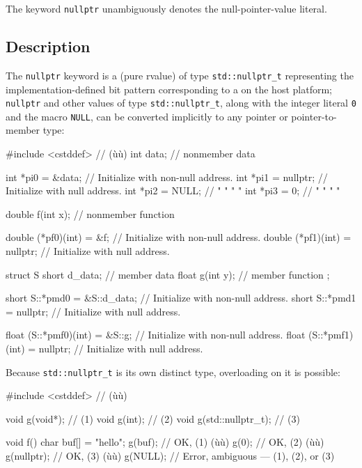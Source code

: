 
The keyword \lstinline!nullptr! unambiguously denotes the
null-pointer-value literal.

\subsection[Description]{Description}\label{description}

The \lstinline!nullptr! keyword is a  (pure rvalue) of type
\lstinline!std::nullptr_t! representing the implementation-defined
bit pattern corresponding to a  on the host platform;
\lstinline!nullptr! and other values of type \lstinline!std::nullptr_t!, along with the integer literal \lstinline!0! and the macro \lstinline!NULL!, can be converted implicitly to any pointer or pointer-to-member type:

\begin{emcppslisting}
#include <cstddef> // (ù{}ù)
int data;  // nonmember data

int *pi0 = &data;    // Initialize with non-null address.
int *pi1 = nullptr;  // Initialize with null address.
int *pi2 = NULL;     //  "          "    "    "
int *pi3 = 0;        //  "          "    "    "

double f(int x);  // nonmember function

double (*pf0)(int) = &f;       // Initialize with non-null address.
double (*pf1)(int) = nullptr;  // Initialize with null address.

struct S
{
    short d_data;    // member data
    float g(int y);  // member function
};

short S::*pmd0 = &S::d_data;  // Initialize with non-null address.
short S::*pmd1 = nullptr;     // Initialize with null address.

float (S::*pmf0)(int) = &S::g;    // Initialize with non-null address.
float (S::*pmf1)(int) = nullptr;  // Initialize with null address.
\end{emcppslisting}


\noindent Because \lstinline!std::nullptr_t! is its own distinct type, overloading on
it is possible:

\begin{emcppslisting}
#include <cstddef>  // (ù{}ù)

void g(void*);           // (1)
void g(int);             // (2)
void g(std::nullptr_t);  // (3)

void f()
{
    char buf[] = "hello";
    g(buf);      // OK, (1) (ù{}ù)
    g(0);        // OK, (2) (ù{}ù)
    g(nullptr);  // OK, (3) (ù{}ù)
    g(NULL);     // Error, ambiguous --- (1), (2), or (3)
}
\end{emcppslisting}


